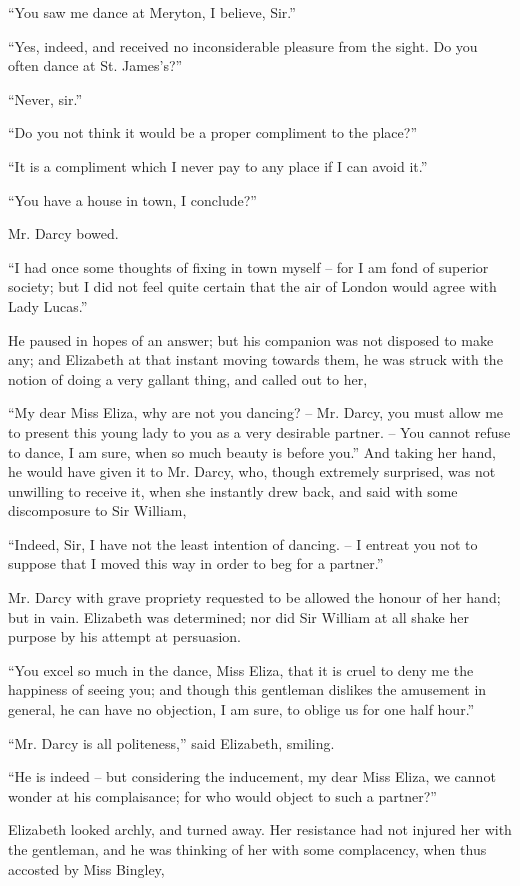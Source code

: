“You saw me dance at Meryton, I believe, Sir.”

“Yes, indeed, and received no inconsiderable pleasure
from the sight. Do you often dance at St. James’s?”

“Never, sir.”

“Do you not think it would be a proper compliment to
the place?”

“It is a compliment which I never pay to any place
if I can avoid it.”

“You have a house in town, I conclude?”

Mr. Darcy bowed.

“I had once some thoughts of fixing in town myself -- for
I am fond of superior society; but I did not feel
quite certain that the air of London would agree with
Lady Lucas.”

He paused in hopes of an answer; but his companion
was not disposed to make any; and Elizabeth at that
instant moving towards them, he was struck with the
notion of doing a very gallant thing, and called out to her,

“My dear Miss Eliza, why are not you dancing? -- Mr.
Darcy, you must allow me to present this young lady
to you as a very desirable partner. -- You cannot refuse
to dance, I am sure, when so much beauty is before you.”
And taking her hand, he would have given it to Mr. Darcy,
who, though extremely surprised, was not unwilling to
receive it, when she instantly drew back, and said with
some discomposure to Sir William,

“Indeed, Sir, I have not the least intention of dancing. --
I entreat you not to suppose that I moved this way in
order to beg for a partner.”

Mr. Darcy with grave propriety requested to be allowed
the honour of her hand; but in vain. Elizabeth was determined;
nor did Sir William at all shake her purpose by his
attempt at persuasion.

“You excel so much in the dance, Miss Eliza, that it is
cruel to deny me the happiness of seeing you; and though
this gentleman dislikes the amusement in general, he can
have no objection, I am sure, to oblige us for one half hour.”

“Mr. Darcy is all politeness,” said Elizabeth, smiling.

“He is indeed -- but considering the inducement, my
dear Miss Eliza, we cannot wonder at his complaisance;
for who would object to such a partner?”

Elizabeth looked archly, and turned away. Her
resistance had not injured her with the gentleman, and
he was thinking of her with some complacency, when thus
accosted by Miss Bingley,

